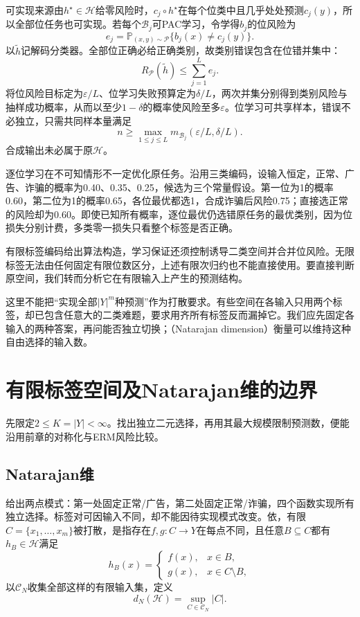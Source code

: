 可实现来源由$h^\star\in\mathcal H$给零风险时，$c_j\circ h^\star$在每个位类中且几乎处处预测$c_j(y)$，所以全部位任务也可实现。若每个$\mathcal B_j$可PAC学习，令学得$b_j$的位风险为
\[
 e_j=\mathbb P_{(x,y)\sim\mathcal P}\{b_j(x)\neq c_j(y)\}.
\]
以$\tilde h$记解码分类器。全部位正确必给正确类别，故类别错误包含在位错并集中：
\[
 R_{\mathcal P}(\tilde h)\leq\sum_{j=1}^L e_j.
\]
将位风险目标定为$\varepsilon/L$、位学习失败预算定为$\delta/L$，两次并集分别得到类别风险与抽样成功概率，从而以至少$1-\delta$的概率使风险至多$\varepsilon$。位学习可共享样本，错误不必独立，只需共同样本量满足
\[
 n\geq\max_{1\leq j\leq L}
 m_{\mathcal B_j}(\varepsilon/L,\delta/L).
\]
合成输出未必属于原$\mathcal H$。

逐位学习在不可知情形不一定优化原任务。沿用三类编码，设输入恒定，正常、广告、诈骗的概率为0.40、0.35、0.25，候选为三个常量假设。第一位为1的概率0.60，第二位为1的概率0.65，各位最优都选1，合成诈骗后风险0.75；直接选正常的风险却为0.60。即使已知所有概率，逐位最优仍选错原任务的最优类别，因为位损失分别计费，多类零一损失只看整个标签是否正确。

有限标签编码给出算法构造，学习保证还须控制诱导二类空间并合并位风险。无限标签无法由任何固定有限位数区分，上述有限次归约也不能直接使用。要直接判断原空间，我们转而分析它在有限输入上产生的预测结构。

这里不能把“实现全部$|Y|^m$种预测”作为打散要求。有些空间在各输入只用两个标签，却已包含任意大的二类难题，要求用齐所有标签反而漏掉它。我们应先固定各输入的两种答案，再问能否独立切换；（Natarajan dimension）衡量可以维持这种自由选择的输入数。

\section{有限标签空间及Natarajan维的边界}
\label{sec:multiclass-dimensions}

先限定$2\leq K=|Y|<\infty$。找出独立二元选择，再用其最大规模限制预测数，便能沿用前章的对称化与ERM风险比较。

\subsection{Natarajan维}

给出两点模式：第一处固定正常/广告，第二处固定正常/诈骗，四个函数实现所有独立选择。标签对可因输入不同，却不能因待实现模式改变。依，有限$C=\{x_1,\ldots,x_m\}$被打散，是指存在$f,g:C\to Y$在每点不同，且任意$B\subseteq C$都有$h_B\in\mathcal H$满足
\begin{equation}
 h_B(x)=\begin{cases}f(x),&x\in B,\\g(x),&x\in C\setminus B,\end{cases}
 \label{eq:learning-natarajan-shattering}
\end{equation}
以$\mathcal C_N$收集全部这样的有限输入集，定义
\[
 d_N(\mathcal H)=\sup_{C\in\mathcal C_N}|C|.
\]

